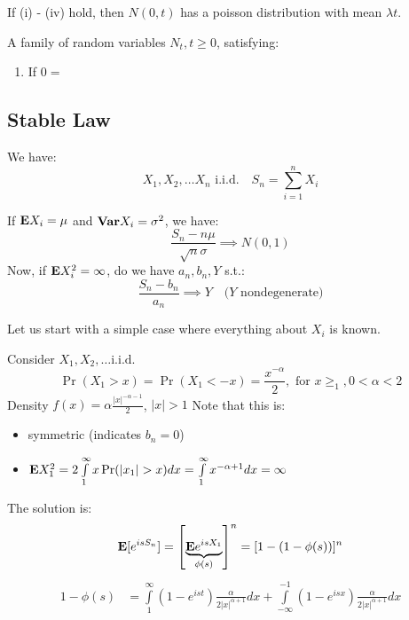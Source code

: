 \documentclass[../main/main.tex]{subfiles}
\begin{document}
\begin{theorem}
	If (i) - (iv) hold, then $N(0,t)$ has a poisson distribution with mean $\lambda t$.
\end{theorem}

\begin{definition}
	A family of random variables $N_t, t \geq 0$, satisfying:
	\begin{enumerate}
		\item If $0=$
	\end{enumerate}
\end{definition}


\subsection{Stable Law}

We have: \[
	X_1, X_2, \ldots X_n \text{ i.i.d.} \quad S_n = \sum\limits_{i=1}^{n} X_i
\]

If $\text{\textbf{E}} X_i = \mu$ and $\text{\textbf{Var}} X_i = \sigma^2$, we have: \[
	\frac{S_{n}-n \mu}{\sqrt{n} \sigma} \implies N(0,1)
\]
Now, if $\text{\textbf{E}} X^2_i = \infty$, do we have $a_n, b_n, Y$ s.t.: \[
	\frac{S_n - b_n}{a_n} \implies Y \quad \text{($Y$ nondegenerate)}
\]

Let us start with a simple case where everything about $X_i$ is known.

\begin{example}Consider \( X_1, X_2, \ldots  \text{i.i.d.} \) \[
		\Pr(X_1 > x) = \Pr(X_1 < -x) = \frac{x^{-\alpha}}{2}, \text{ for } x \geq_1, 0<\alpha<2
	\]
	Density $f(x) = \alpha \frac{|x|^{-\alpha-1}}{2}$, $|x|>1$
	Note that this is:
	\begin{itemize}
		\item symmetric (indicates $b_n=0$)
		\item $\E X^2_1 = 2 \int\limits_{1}^{\infty}x \Pr(|x_1|>x) dx = \int\limits_{1}^{\infty}x^{-\alpha + 1 }dx = \infty$
	\end{itemize}
	The solution is: \[
		\text{\textbf{E}}[e^{is S_n}] = \left[ \underbrace{\text{\textbf{E}} e^{is X_1}}_{\phi(s)} \right]^{n} = [1-(1-\phi(s))]^{n}
	\]
	\begin{align*}
		1-\phi(s) & = \int\limits_{1}^{\infty}(1-e^{ist}) \frac{\alpha}{2|x|^{\alpha+1}} dx + \int\limits_{-\infty}^{-1}(1-e^{isx}) \frac{\alpha}{2|x|^{\alpha+1}}dx \\
	\end{align*}

\end{example}
\end{document}
